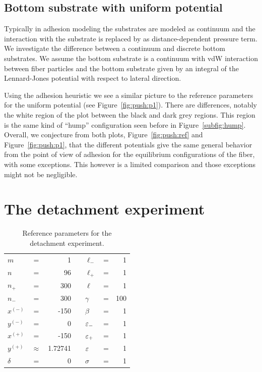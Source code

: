\subsection{Bottom substrate with uniform potential} \label{section:compression:pressure}

Typically in adhesion modeling the substrates are modeled as continuum and the interaction with the substrate is replaced by as distance-dependent pressure term. We investigate the difference between a continuum and discrete bottom substrates. We assume the bottom substrate is a continuum with vdW interaction between fiber particles and the bottom substrate given by an integral of the Lennard-Jones potential with respect to lateral direction.

Using the adhesion heuristic we see a similar picture to the reference parameters for the uniform potential (see Figure~\ref{fig:push:p1}). There are differences, notably the white region of the plot between the black and dark grey regions. This region is the same kind of ``hump'' configuration seen before in Figure~\ref{subfig:hump}. Overall, we conjecture from both plots, Figure~\ref{fig:push:ref} and Figure~\ref{fig:push:p1}, that the different potentials give the same general behavior from the point of view of adhesion for the equilibrium configurations of the fiber, with some exceptions. This however is a limited comparison and those exceptions might not be negligible.

\section{The detachment experiment} \label{ch:detachment}

   \begin{table}[t]
      \centering
      \caption{Reference parameters for the detachment experiment. \label{table:detachment_reference}}
      \begin{tabular}{lcrclcr}
         $m$ & = & 1 & \hspace{1in} & $\ell_-$ & = & 1 \\
         $n$ & = & 96 & & $\ell_+$ & = & 1 \\
         $n_+$ & = & 300 & & $\ell$ & = & 1 \\
         $n_-$ & = & 300 & & $\gamma$ & = & 100 \\
         $x^{(-)}$ & = & -150 & & $\beta$ & = & 1 \\
         $y^{(-)}$ & = & 0 & & $\varepsilon_-$ & = & 1 \\
         $x^{(+)}$ & = & -150 & & $\varepsilon_+$ & = & 1 \\
         $y^{(+)}$ & $\approx$ & 1.72741 & & $\varepsilon$ & = & 1 \\
         $\delta$ & = & 0 & & $\sigma$ & = & 1
      \end{tabular}
   \end{table}

